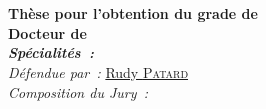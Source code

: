 \documentclass[12pt,twoside,a4paper,english,french]{book} %
\begin{document}
\begin{titlepage}
{%
   }\\[0.1cm] %
  \HRule \\[0.3cm]
  { %
  \bfseries
	Thèse pour l'obtention du grade de\\
	Docteur de \\%
	\emph{Spécialités~:}\\
	}
\emph{Défendue par~:} %
\href{mailto:rudy.patard@gmail.com}{Rudy \textsc{Patard}}\\ %
  \emph{Composition du Jury~:}\\[0.2cm]
  {\small
}
\end{titlepage}
\end{document}
